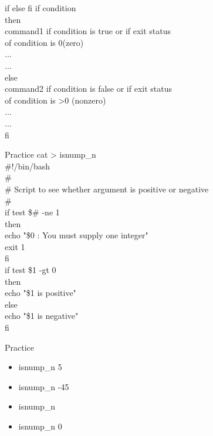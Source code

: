 \documentclass{beamer}
\begin{document}
\begin{frame}{if else fi}
if condition \\
then \\
command1 if condition is true or if exit status \\
of condition is 0(zero) \\
... \\
... \\
else \\
command2 if condition is false or if exit status \\
of condition is >0 (nonzero) \\
... \\
... \\
fi
\end{frame}

\begin{frame}{Practice}
cat > isnump\_n \\
\#!/bin/bash \\
\# \\
\# Script to see whether argument is positive or negative \\
\# \\
if test \$\# -ne 1 \\
then \\
echo "\$0 : You must supply one integer" \\
exit 1 \\
fi \\
if test \$1 -gt 0 \\
then \\
echo "\$1 is positive" \\
else \\
echo "\$1 is negative" \\
fi 
\end{frame}

\begin{frame}{Practice}
\begin{itemize}
\item isnump\_n 5
\item isnump\_n -45
\item isnump\_n
\item isnump\_n 0
\end{itemize}
\end{frame}
\end{document}
